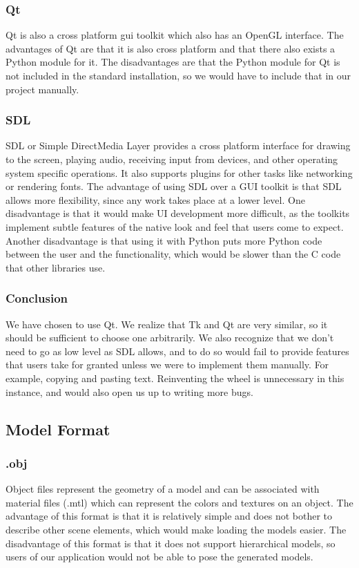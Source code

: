 \documentclass[letterpaper,10pt, onecolumn, draftclsnofoot]{IEEEtran}
\begin{document}
\subsubsection{Qt}
Qt is also a cross platform gui toolkit which also has an OpenGL interface. The advantages of Qt are that it is also cross platform and that there also exists a Python module for it. The disadvantages are that the Python module for Qt is not included in the standard installation, so we would have to include that in our project manually.

\subsubsection{SDL}
SDL or Simple DirectMedia Layer provides a cross platform interface for drawing to the screen, playing audio, receiving input from devices, and other operating system specific operations. It also supports plugins for other tasks like networking or rendering fonts. The advantage of using SDL over a GUI toolkit is that SDL allows more flexibility, since any work takes place at a lower level. One disadvantage is that it would make UI development more difficult, as the toolkits implement subtle features of the native look and feel that users come to expect. Another disadvantage is that using it with Python puts more Python code between the user and the functionality, which would be slower than the C code that other libraries use.

\subsubsection{Conclusion}
We have chosen to use Qt. We realize that Tk and Qt are very similar, so it should be sufficient to choose one arbitrarily. We also recognize that we don't need to go as low level as SDL allows, and to do so would fail to provide features that users take for granted unless we were to implement them manually. For example, copying and pasting text. Reinventing the wheel is unnecessary in this instance, and would also open us up to writing more bugs.

\subsection{Model Format}
\subsubsection{.obj}
Object files represent the geometry of a model and can be associated with material files (.mtl) which can represent the colors and textures on an object. The advantage of this format is that it is relatively simple and does not bother to describe other scene elements, which would make loading the models easier. The disadvantage of this format is that it does not support hierarchical models, so users of our application would not be able to pose the generated models.
\end{document}
